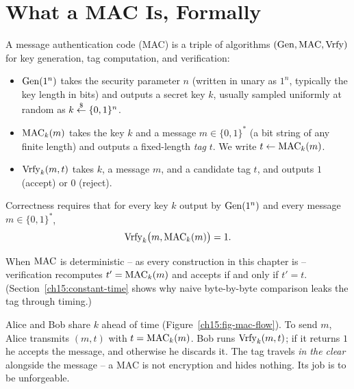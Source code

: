\section{What a MAC Is, Formally}
\label{ch15:mac-syntax}

\begin{definition}
\label{ch15:def-mac}
A message authentication code (MAC) is a triple of algorithms $(\operatorname{Gen},\operatorname{MAC},\operatorname{Vrfy})$ for key generation, tag computation, and verification:
\begin{itemize}
  \item $\operatorname{Gen}(1^n)$ takes the security parameter $n$ (written in unary as $1^n$, typically the key length in bits) and outputs a secret key $k$, usually sampled uniformly at random as $k\stackrel{\$}{\gets}\{0,1\}^n$.
  \item $\operatorname{MAC}_k(m)$ takes the key $k$ and a message $m\in\{0,1\}^*$ (a bit string of any finite length) and outputs a fixed-length \emph{tag} $t$. We write $t \gets \operatorname{MAC}_k(m)$.
  \item $\operatorname{Vrfy}_k(m,t)$ takes $k$, a message $m$, and a candidate tag $t$, and outputs $1$ (accept) or $0$ (reject).
\end{itemize}
Correctness requires that for every key $k$ output by $\operatorname{Gen}(1^n)$ and every message $m \in \{0,1\}^*$,
\[
  \operatorname{Vrfy}_k\bigl(m,\operatorname{MAC}_k(m)\bigr) = 1.
\]
\end{definition}

When $\operatorname{MAC}$ is deterministic -- as every construction in this chapter is -- verification recomputes $t' = \operatorname{MAC}_k(m)$ and accepts if and only if $t' = t$. (Section~\ref{ch15:constant-time} shows why naive byte-by-byte comparison leaks the tag through timing.)

Alice and Bob share $k$ ahead of time (Figure~\ref{ch15:fig-mac-flow}). To send $m$, Alice transmits $(m, t)$ with $t=\operatorname{MAC}_k(m)$. Bob runs $\operatorname{Vrfy}_k(m,t)$; if it returns $1$ he accepts the message, and otherwise he discards it. The tag travels \emph{in the clear} alongside the message -- a MAC is not encryption and hides nothing. Its job is to be unforgeable.

